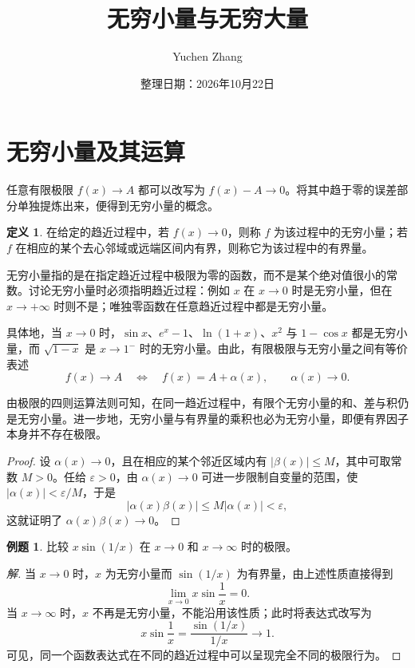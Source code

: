 \documentclass[UTF8,fontset=fandol,a4paper,12pt]{ctexart}
\title{无穷小量与无穷大量}
\author{Yuchen Zhang}
\date{整理日期：2026年10月22日}
\makeatletter
\theoremstyle{definition}
\newtheorem*{definition}{定义}
\newtheorem*{example}{例题}
\renewcommand{\maketitle}{\begin{center}
{\LARGE\bfseries \@title\par}\vspace{0.6em}
\@author\par\vspace{0.2em}{\small\@date\par}
\end{center}}
\makeatother
\begin{document}
\maketitle

\section{无穷小量及其运算}
任意有限极限 $f(x)\to A$ 都可以改写为 $f(x)-A\to0$。将其中趋于零的误差部分单独提炼出来，便得到无穷小量的概念。

\begin{definition}
在给定的趋近过程中，若 $f(x)\to0$，则称 $f$ 为该过程中的无穷小量；若 $f$ 在相应的某个去心邻域或远端区间内有界，则称它为该过程中的有界量。
\end{definition}

无穷小量指的是在指定趋近过程中极限为零的函数，而不是某个绝对值很小的常数。讨论无穷小量时必须指明趋近过程：例如 $x$ 在 $x\to0$ 时是无穷小量，但在 $x\to+\infty$ 时则不是；唯独零函数在任意趋近过程中都是无穷小量。

具体地，当 $x\to0$ 时，$\sin x$、$e^x-1$、$\ln(1+x)$、$x^2$ 与 $1-\cos x$ 都是无穷小量，而 $\sqrt{1-x}$ 是 $x\to1^-$ 时的无穷小量。由此，有限极限与无穷小量之间有等价表述
\[
 f(x)\to A\quad\Longleftrightarrow\quad
 f(x)=A+\alpha(x),\qquad\alpha(x)\to0.
\]

由极限的四则运算法则可知，在同一趋近过程中，有限个无穷小量的和、差与积仍是无穷小量。进一步地，无穷小量与有界量的乘积也必为无穷小量，即便有界因子本身并不存在极限。

\begin{proof}
设 $\alpha(x)\to0$，且在相应的某个邻近区域内有 $|\beta(x)|\le M$，其中可取常数 $M>0$。任给 $\varepsilon>0$，由 $\alpha(x)\to0$ 可进一步限制自变量的范围，使 $|\alpha(x)|<\varepsilon/M$，于是
\[
 |\alpha(x)\beta(x)|\le M|\alpha(x)|<\varepsilon,
\]
这就证明了 $\alpha(x)\beta(x)\to0$。
\end{proof}

\begin{example}
比较 $x\sin(1/x)$ 在 $x\to0$ 和 $x\to\infty$ 时的极限。
\end{example}
\begin{proof}[解]
当 $x\to0$ 时，$x$ 为无穷小量而 $\sin(1/x)$ 为有界量，由上述性质直接得到
\[
 \lim_{x\to0}x\sin\frac1x=0.
\]
当 $x\to\infty$ 时，$x$ 不再是无穷小量，不能沿用该性质；此时将表达式改写为
\[
 x\sin\frac1x=\frac{\sin(1/x)}{1/x}\to1.
\]
可见，同一个函数表达式在不同的趋近过程中可以呈现完全不同的极限行为。
\end{proof}
\end{document}
